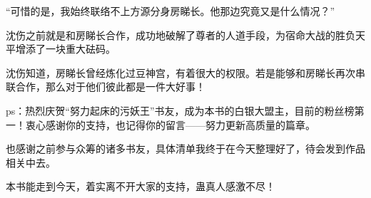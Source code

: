 \begin{this_body}
“可惜的是，我始终联络不上方源分身房睇长。他那边究竟又是什么情况？”

沈伤之前就是和房睇长合作，成功地破解了尊者的人道手段，为宿命大战的胜负天平增添了一块重大砝码。

沈伤知道，房睇长曾经炼化过豆神宫，有着很大的权限。若是能够和房睇长再次串联合作，那么对于他们彼此都是一件大好事！

ps：热烈庆贺“努力起床的污妖王”书友，成为本书的白银大盟主，目前的粉丝榜第一！衷心感谢你的支持，也记得你的留言——努力更新高质量的篇章。

也感谢之前参与众筹的诸多书友，具体清单我终于在今天整理好了，待会发到作品相关中去。

本书能走到今天，着实离不开大家的支持，蛊真人感激不尽！

\end{this_body}

